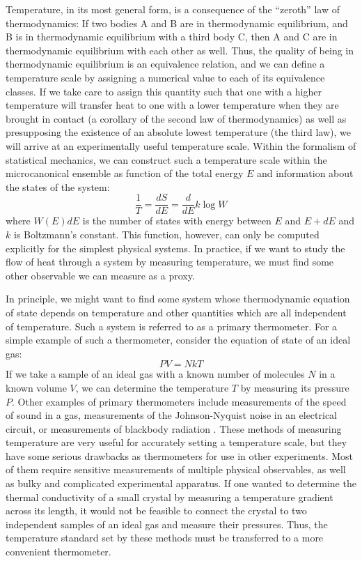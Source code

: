 \documentclass{thesis-umich}
\begin{document}
Temperature, in its most general form, is a consequence of the ``zeroth'' law
of thermodynamics: If two bodies A and B are in thermodynamic equilibrium, and
B is in thermodynamic equilibrium with a third body C, then A and C are in
thermodynamic equilibrium with each other as well. Thus, the quality of being
in thermodynamic equilibrium is an equivalence relation, and we can define a
temperature scale by assigning a numerical value to each of its equivalence
classes. If we take care to assign this quantity such that one with a higher
temperature will transfer heat to one with a lower temperature when they are
brought in contact (a corollary of the second law of thermodynamics) as well as
presupposing the existence of an absolute lowest temperature (the third law), we will arrive
at an experimentally useful temperature scale. Within the formalism of
statistical mechanics, we can construct  such a temperature scale within the
microcanonical ensemble as function of the total energy \(E\) and information
about the states of the system: \[\frac{1}{T} = \frac{dS}{dE} = \frac{d}{dE} k
\log W\] where \(W(E)dE\) is the number of states with energy between \(E\) and
\(E+dE\) and \(k\) is Boltzmann's constant. This function, however, can only be
computed explicitly for the simplest physical systems. In practice, if we want
to study the flow of heat through a system by measuring temperature, we must
find some other observable we can measure as a proxy.

In principle, we might want to find some system whose thermodynamic
equation of state depends on temperature and other quantities which are
all independent of temperature. Such a system is referred to as a primary
thermometer. For a simple example of such a thermometer, consider the
equation of state of an ideal gas: \[PV = NkT\] If we take a sample of
an ideal gas with a known number of molecules \(N\) in a known volume
\(V\), we can determine the temperature \(T\) by measuring its pressure
\(P\). Other examples of primary thermometers include measurements of
the speed of sound in a gas, measurements of the Johnson-Nyquist noise
in an electrical circuit, or measurements of blackbody radiation
\cite{Ekin2006}. These methods of measuring temperature are very useful
for accurately setting a temperature scale, but they have some serious
drawbacks as thermometers for use in other experiments. Most of them
require sensitive measurements of multiple physical observables, as well
as bulky and complicated experimental apparatus. If one wanted to
determine the thermal conductivity of a small crystal by measuring a
temperature gradient across its length, it would not be feasible to
connect the crystal to two independent samples of an ideal gas and
measure their pressures. Thus, the temperature standard set by these
methods must be transferred to a more convenient thermometer.
\end{document}
